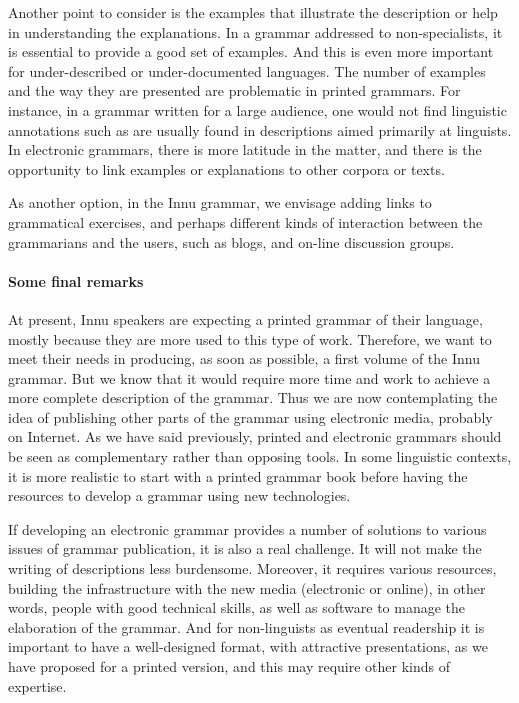 Another point to consider is the examples that illustrate the description or help in understanding the explanations. In a grammar addressed to non-specialists, it is essential to provide a good set of examples. And this is even more important for under-described or under-documented languages. The number of examples and the way they are presented are problematic in printed grammars. For instance, in a grammar written for a large audience, one would not find linguistic annotations such as are usually found in descriptions aimed primarily at linguists. In electronic grammars, there is more latitude in the matter, and there is the opportunity to link examples or explanations to other corpora or texts.

As another option, in the Innu grammar, we envisage adding links to grammatical exercises, and perhaps different kinds of interaction between the grammarians and the users, such as blogs, and on-line discussion groups.

\paragraph{Some final remarks}
At present, Innu speakers are expecting a printed grammar of their language, mostly because they are more used to this type of work. Therefore, we want to meet their needs in producing, as soon as possible, a first volume of the Innu grammar. But we know that it would require more time and work to achieve a more complete description of the grammar. Thus we are now contemplating the idea of publishing other parts of the grammar using electronic media, probably on Internet. As we have said previously, printed and electronic grammars should be seen as complementary rather than opposing tools. In some linguistic contexts, it is more realistic to start with a printed grammar book before having the resources to develop a grammar using new technologies. 

If developing an electronic grammar provides a number of solutions to various issues of grammar publication, it is also a real challenge. It will not make the writing of descriptions less burdensome. Moreover, it requires various resources, building the infrastructure with the new media (electronic or online), in other words, people with good technical skills, as well as software to manage the elaboration of the grammar. And for non-linguists as eventual readership it is important to have a well-designed format, with attractive presentations, as we have proposed for a printed version, and this may require other kinds of expertise.

